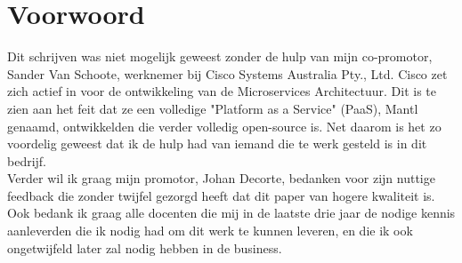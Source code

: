 \chapter*{Voorwoord}
\label{ch:voorwoord}

Dit schrijven was niet mogelijk geweest zonder de hulp van mijn co-promotor, Sander Van Schoote, werknemer bij Cisco Systems Australia Pty., Ltd. 
Cisco zet zich actief in voor de ontwikkeling van de Microservices Architectuur. Dit is te zien aan het feit dat ze een volledige "Platform as a Service" (PaaS), Mantl genaamd, ontwikkelden die verder volledig open-source is. Net daarom is het zo voordelig geweest dat ik de hulp had van iemand die te werk gesteld is in dit bedrijf.
\\
Verder wil ik graag mijn promotor, Johan Decorte, bedanken voor zijn nuttige feedback die zonder twijfel gezorgd heeft dat dit paper van hogere kwaliteit is.
\\
Ook bedank ik graag alle docenten die mij in de laatste drie jaar de nodige kennis aanleverden die ik nodig had om dit werk te kunnen leveren, en die ik ook ongetwijfeld later zal nodig hebben in de business.